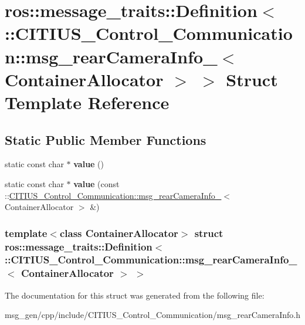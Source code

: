 \hypertarget{structros_1_1message__traits_1_1_definition_3_01_1_1_c_i_t_i_u_s___control___communication_1_1ms210074c7eb0fdd7d1793cfc3ebf6bc63}{\section{ros\-:\-:message\-\_\-traits\-:\-:\-Definition$<$ \-:\-:\-C\-I\-T\-I\-U\-S\-\_\-\-Control\-\_\-\-Communication\-:\-:msg\-\_\-rear\-Camera\-Info\-\_\-$<$ \-Container\-Allocator $>$ $>$ \-Struct \-Template \-Reference}
\label{structros_1_1message__traits_1_1_definition_3_01_1_1_c_i_t_i_u_s___control___communication_1_1ms210074c7eb0fdd7d1793cfc3ebf6bc63}
}
\subsection*{\-Static \-Public \-Member \-Functions}
\begin{DoxyCompactItemize}
\item 
\hypertarget{structros_1_1message__traits_1_1_definition_3_01_1_1_c_i_t_i_u_s___control___communication_1_1ms210074c7eb0fdd7d1793cfc3ebf6bc63_ac30d9675a7a2b83c451ed25c57e8b83c}{static const char $\ast$ {\bfseries value} ()}\label{structros_1_1message__traits_1_1_definition_3_01_1_1_c_i_t_i_u_s___control___communication_1_1ms210074c7eb0fdd7d1793cfc3ebf6bc63_ac30d9675a7a2b83c451ed25c57e8b83c}

\item 
\hypertarget{structros_1_1message__traits_1_1_definition_3_01_1_1_c_i_t_i_u_s___control___communication_1_1ms210074c7eb0fdd7d1793cfc3ebf6bc63_aa24f4e4b5fdbfc6f0826fb4b0f02b6a6}{static const char $\ast$ {\bfseries value} (const \-::\hyperlink{struct_c_i_t_i_u_s___control___communication_1_1msg__rear_camera_info__}{\-C\-I\-T\-I\-U\-S\-\_\-\-Control\-\_\-\-Communication\-::msg\-\_\-rear\-Camera\-Info\-\_\-}$<$ \-Container\-Allocator $>$ \&)}\label{structros_1_1message__traits_1_1_definition_3_01_1_1_c_i_t_i_u_s___control___communication_1_1ms210074c7eb0fdd7d1793cfc3ebf6bc63_aa24f4e4b5fdbfc6f0826fb4b0f02b6a6}

\end{DoxyCompactItemize}
\subsubsection*{template$<$class Container\-Allocator$>$ struct ros\-::message\-\_\-traits\-::\-Definition$<$ \-::\-C\-I\-T\-I\-U\-S\-\_\-\-Control\-\_\-\-Communication\-::msg\-\_\-rear\-Camera\-Info\-\_\-$<$ Container\-Allocator $>$ $>$}



\-The documentation for this struct was generated from the following file\-:\begin{DoxyCompactItemize}
\item 
msg\-\_\-gen/cpp/include/\-C\-I\-T\-I\-U\-S\-\_\-\-Control\-\_\-\-Communication/msg\-\_\-rear\-Camera\-Info.\-h\end{DoxyCompactItemize}
